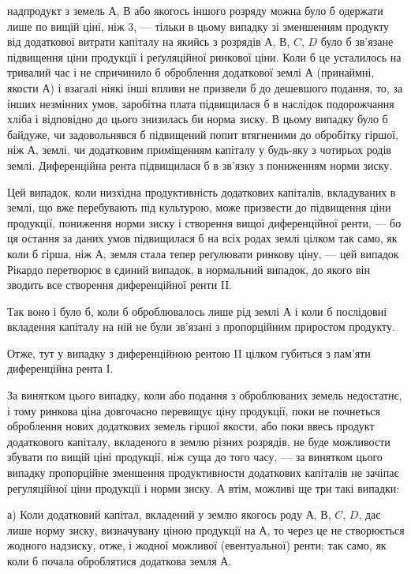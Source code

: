 \parcont{}  %
надпродукт з земель $А$, $В$ або якогось іншого розряду можна було б одержати
лише по вищій ціні, ніж 3, — тільки в цьому випадку зі зменшенням
продукту від додаткової витрати капіталу на якийсь з розрядів $А$, $В$, $C$, $D$
було б зв’язане підвищення ціни продукції і реґуляційної ринкової ціни.
Коли б це усталилось на тривалий час і не спричинило б оброблення додаткової
землі $А$ (принаймні, якости $А$) і взагалі ніякі інші впливи не призвели б
до дешевшого подання, то, за інших незмінних умов, заробітна плата підвищилася б
в наслідок подорожчання хліба і відповідно до цього знизилась би норма зиску.
В цьому випадку було б байдуже, чи задовольнявся б підвищений попит втягненими
до обробітку гіршої, ніж $А$, землі, чи додатковим приміщенням капіталу
у будь-яку з чотирьох родів землі. Диференційна рента підвищилася б в зв’язку
з пониженням норми зиску.

Цей випадок, коли низхідна продуктивність додаткових капіталів, вкладуваних
в землі, що вже перебувають під культурою, може призвести до підвищення
ціни продукції, пониження норми зиску і створення вищої диференційної
ренти, — бо ця остання за даних умов підвищилася б на всіх родах землі
цілком так само, як коли б гірша, ніж $А$, земля стала тепер реґулювати ринкову
ціну, — цей випадок Рікардо перетворює в єдиний випадок, в нормальний
випадок, до якого він зводить все створення диференційної ренти II.

Так воно і було б, коли б оброблювалось лише рід землі $А$ і коли б послідовні
вкладення капіталу на ній не були зв’язані з пропорційним приростом
продукту.

Отже, тут у випадку з диференційною рентою II цілком губиться з пам’яти
диференційна рента І.

За винятком цього випадку, коли або подання з оброблюваних земель
недостатнє, і тому ринкова ціна довгочасно перевищує ціну продукції, поки не
почнеться оброблення нових додаткових земель гіршої якости, або поки ввесь продукт
додаткового капіталу, вкладеного в землю різних розрядів, не буде можливости
збувати по вищій ціні продукції, ніж суща до того часу, — за винятком
цього випадку пропорційне зменшення продуктивности додаткових капіталів не
зачіпає регуляційної ціни продукції і норми зиску. А втім, можливі ще три
такі випадки:

а) Коли додатковий капітал, вкладений у землю якогось роду $А$, $В$, $C$, $D$,
дає лише норму зиску, визначувану ціною продукції на $А$, то через це не
створюється жодного надзиску, отже, і жодної можливої (евентуальної) ренти;
так само, як коли б почала оброблятися додаткова земля $А$.

